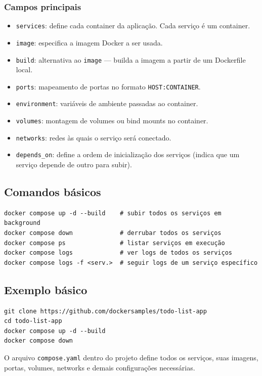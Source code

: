 \subsubsection{Campos principais}

\begin{itemize}
    \item \texttt{services}: define cada container da aplicação. Cada serviço é um container.
    \item \texttt{image}: especifica a imagem Docker a ser usada.
    \item \texttt{build}: alternativa ao \texttt{image} --- builda a imagem a partir de um Dockerfile local.
    \item \texttt{ports}: mapeamento de portas no formato \texttt{HOST:CONTAINER}.
    \item \texttt{environment}: variáveis de ambiente passadas ao container.
    \item \texttt{volumes}: montagem de volumes ou bind mounts no container.
    \item \texttt{networks}: redes às quais o serviço será conectado.
    \item \texttt{depends\_on}: define a ordem de inicialização dos serviços (indica que um serviço depende de outro para subir).
\end{itemize}

\subsection{Comandos básicos}

\begin{verbatim}
docker compose up -d --build    # subir todos os serviços em background
docker compose down             # derrubar todos os serviços
docker compose ps               # listar serviços em execução
docker compose logs             # ver logs de todos os serviços
docker compose logs -f <serv.>  # seguir logs de um serviço específico
\end{verbatim}

\subsection{Exemplo básico}

\begin{verbatim}
git clone https://github.com/dockersamples/todo-list-app
cd todo-list-app
docker compose up -d --build
docker compose down
\end{verbatim}

O arquivo \texttt{compose.yaml} dentro do projeto define todos os serviços, suas imagens, portas, volumes, networks e demais configurações necessárias.

